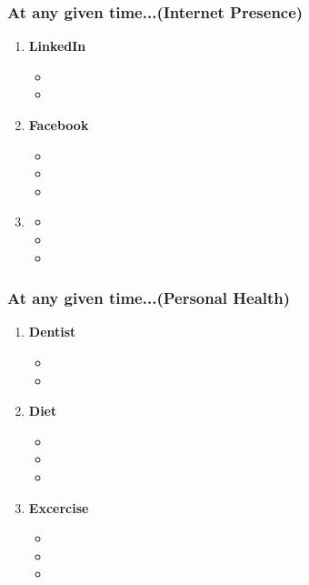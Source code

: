 \begin{frame}
\frametitle{At any given time...(Internet Presence)}
\begin{enumerate}
\item \small \textbf{LinkedIn}
\begin{itemize} 
\item \tiny 
\item \tiny
\end{itemize} 
\item \small \textbf{Facebook}
\begin{itemize} 
\item \tiny 
\item \tiny 
\item \tiny 
\end{itemize} 
\item \small \textbf{} 
\begin{itemize} 
\item \tiny 
\item \tiny 
\item \tiny 
\end{itemize} 
\end{enumerate}
\end{frame}

\begin{frame}
\frametitle{At any given time...(Personal Health)}
\begin{enumerate}
\item \small \textbf{Dentist}
\begin{itemize} 
\item \tiny 
\item \tiny
\end{itemize} 
\item \small \textbf{Diet}
\begin{itemize} 
\item \tiny 
\item \tiny 
\item \tiny 
\end{itemize} 
\item \small \textbf{Excercise} 
\begin{itemize} 
\item \tiny 
\item \tiny 
\item \tiny 
\end{itemize} 
\end{enumerate} 
\end{frame} 

